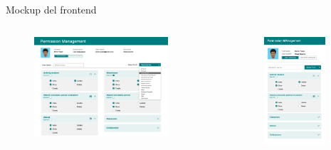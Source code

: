 \documentclass[aspectratio=169]{beamer}
\begin{document}
\begin{frame}[fragile]{Mockup del frontend}
	\begin{columns}[T] %
		\begin{column}{0.7\textwidth}
			\begin{figure}
				\centering
				\includegraphics[width=0.85\textwidth]{../images/permission-management-desktop-mockup.jpg}
			\end{figure}
		\end{column}
		\begin{column}{0.3\textwidth}
			\begin{figure}
				\centering
				\includegraphics[width=0.85\textwidth]{../images/permission-management-mobile-mockup.jpg}

\end{figure}
\end{column}
\end{columns}
\end{frame}
\end{document}
